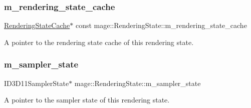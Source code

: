 \subsubsection{\texorpdfstring{m\+\_\+rendering\+\_\+state\+\_\+cache}{m\_rendering\_state\_cache}}
{\footnotesize\ttfamily \hyperlink{structmage_1_1_rendering_state_cache}{Rendering\+State\+Cache}$\ast$ const mage\+::\+Rendering\+State\+::m\+\_\+rendering\+\_\+state\+\_\+cache\hspace{0.3cm}{\ttfamily [private]}}

A pointer to the rendering state cache of this rendering state. \hypertarget{structmage_1_1_rendering_state_a88c58f587b9670d662aef5a3a52fa38d}{}\label{structmage_1_1_rendering_state_a88c58f587b9670d662aef5a3a52fa38d} 
\subsubsection{\texorpdfstring{m\+\_\+sampler\+\_\+state}{m\_sampler\_state}}
{\footnotesize\ttfamily I\+D3\+D11\+Sampler\+State$\ast$ mage\+::\+Rendering\+State\+::m\+\_\+sampler\+\_\+state\hspace{0.3cm}{\ttfamily [private]}}

A pointer to the sampler state of this rendering state. 